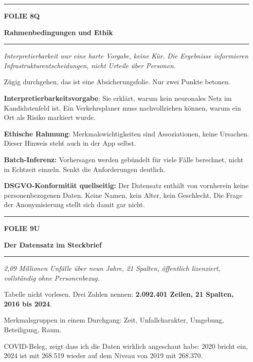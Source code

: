 \documentclass[9pt]{extarticle}
\newcommand{\karte}[3]{%
  \clearpage
  {\color{Accent}\rule{\linewidth}{2.4pt}}\par\vspace{2.5pt}
  {\fontsize{8}{9}\selectfont\bfseries\color{Accent}%
   FOLIE #1\hspace{1.2em}\textbar\hspace{1.2em}#2}\par\vspace{1pt}
  {\fontsize{16}{18}\selectfont\bfseries\color{AccentDark}#3}\par\vspace{3pt}
  {\color{Accent!45}\rule{\linewidth}{0.5pt}}\par\vspace{4pt}%
}
\newcommand{\rubrik}[1]{%
  \vspace{3.5pt}{\fontsize{7.5}{8.5}\selectfont\bfseries\color{Grau}%
  \MakeUppercase{#1}}\par\vspace{1.5pt}}
\newcommand{\kernsatz}[1]{%
  \begin{tcolorbox}[enhanced,sharp corners,boxrule=0pt,
    leftrule=2.2pt,colframe=Accent,colback=AccentPale,
    left=5pt,right=5pt,top=3.5pt,bottom=3.5pt,before skip=1pt,after skip=2pt]
    \color{AccentDark}\itshape #1
  \end{tcolorbox}}
\newcommand{\bg}[2]{\item \textbf{#1:} #2}
\begin{document}
\karte{8}{Q}{Rahmenbedingungen und Ethik}

\kernsatz{Interpretierbarkeit war eine harte Vorgabe, keine Kür. Die Ergebnisse informieren
Infrastrukturentscheidungen, nicht Urteile über Personen.}

\rubrik{Sagen}
\begin{sag}
  \item Zügig durchgehen, das ist eine Absicherungsfolie. Nur zwei Punkte betonen.
  \item \textbf{Interpretierbarkeitsvorgabe}: Sie erklärt, warum kein neuronales Netz im
        Kandidatenfeld ist. Ein Verkehrsplaner muss nachvollziehen können, warum ein Ort
        als Risiko markiert wurde.
  \item \textbf{Ethische Rahmung}: Merkmalswichtigkeiten sind Assoziationen, keine Ursachen.
        Dieser Hinweis steht auch in der App selbst.
\end{sag}

\rubrik{Begriffe}
\begin{begriff}
  \bg{Batch-Inferenz}{Vorhersagen werden gebündelt für viele Fälle berechnet, nicht in
      Echtzeit einzeln. Senkt die Anforderungen deutlich.}
  \bg{DSGVO-Konformität quellseitig}{Der Datensatz enthält von vornherein keine
      personenbezogenen Daten. Keine Namen, kein Alter, kein Geschlecht. Die Frage der
      Anonymisierung stellt sich damit gar nicht.}
\end{begriff}

\karte{9}{U}{Der Datensatz im Steckbrief}

\kernsatz{2,09 Millionen Unfälle über neun Jahre, 21 Spalten, öffentlich lizenziert,
vollständig ohne Personenbezug.}

\rubrik{Sagen}
\begin{sag}
  \item Tabelle nicht vorlesen. Drei Zahlen nennen: \textbf{2.092.401 Zeilen, 21 Spalten,
        2016 bis 2024}.
  \item Merkmalsgruppen in einem Durchgang: Zeit, Unfallcharakter, Umgebung, Beteiligung, Raum.
  \item COVID-Beleg, zeigt dass ich die Daten wirklich angeschaut habe: 2020 bricht ein,
        2024 ist mit 268.519 wieder auf dem Niveau von 2019 mit 268.370.
\end{sag}
\end{document}
